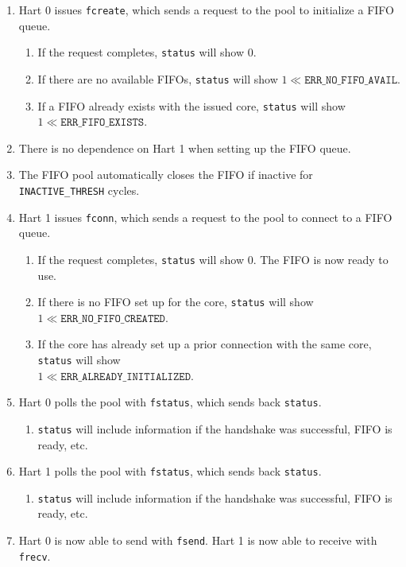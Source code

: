 \begin{enumerate}
  \item Hart 0 issues \texttt{fcreate}, which sends a request to the pool to initialize a FIFO queue.
  \begin{enumerate}
      \item If the request completes, \texttt{status} will show 0.
      \item If there are no available FIFOs, \texttt{status} will show \( 1 \ll \texttt{ERR\_NO\_FIFO\_AVAIL} \).
      \item If a FIFO already exists with the issued core, \texttt{status} will show \( 1 \ll \texttt{ERR\_FIFO\_EXISTS} \).
  \end{enumerate}
  
  \item There is no dependence on Hart 1 when setting up the FIFO queue.
  
  \item The FIFO pool automatically closes the FIFO if inactive for \texttt{INACTIVE\_THRESH} cycles.
  
  \item Hart 1 issues \texttt{fconn}, which sends a request to the pool to connect to a FIFO queue.
  \begin{enumerate}
      \item If the request completes, \texttt{status} will show 0. The FIFO is now ready to use.
      \item If there is no FIFO set up for the core, \texttt{status} will show \( 1 \ll \texttt{ERR\_NO\_FIFO\_CREATED} \).
      \item If the core has already set up a prior connection with the same core, \texttt{status} will show \\
        \( 1 \ll \texttt{ERR\_ALREADY\_INITIALIZED} \).


  \end{enumerate}
  
  \item Hart 0 polls the pool with \texttt{fstatus}, which sends back \texttt{status}.
  \begin{enumerate}
      \item \texttt{status} will include information if the handshake was successful, FIFO is ready, etc.
  \end{enumerate}
  
  \item Hart 1 polls the pool with \texttt{fstatus}, which sends back \texttt{status}.
  \begin{enumerate}
      \item \texttt{status} will include information if the handshake was successful, FIFO is ready, etc.
  \end{enumerate}
  
  \item Hart 0 is now able to send with \texttt{fsend}. Hart 1 is now able to receive with \texttt{frecv}.
\end{enumerate}


